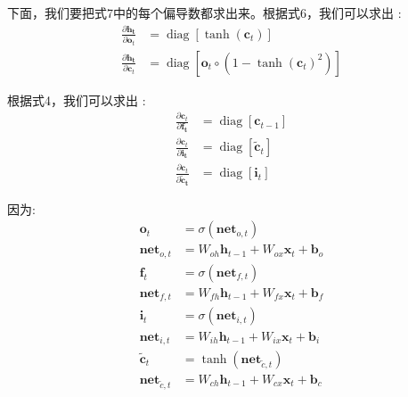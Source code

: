 \documentclass[10.5pt,compsoc]{CjC}
\theoremstyle{mystyle}
\begin{document}
下面，我们要把式7中的每个偏导数都求出来。根据式6，我们可以求出 :
$$
\begin{aligned}
\frac{\partial \mathbf{h}_{\mathbf{t}}}{\partial \mathbf{o}_{t}} &=\operatorname{diag}\left[\tanh \left(\mathbf{c}_{t}\right)\right] \\
\frac{\partial \mathbf{h}_{\mathbf{t}}}{\partial \mathbf{c}_{t}} &=\operatorname{diag}\left[\mathbf{o}_{t} \circ\left(1-\tanh \left(\mathbf{c}_{t}\right)^{2}\right)\right]
\end{aligned}
$$

根据式4，我们可以求出 :
$$
\begin{aligned}
\frac{\partial \mathbf{c}_{t}}{\partial \mathbf{f}_{\mathbf{t}}} &=\operatorname{diag}\left[\mathbf{c}_{t-1}\right] \\
\frac{\partial \mathbf{c}_{t}}{\partial \mathbf{i}_{\mathbf{t}}} &=\operatorname{diag}\left[\tilde{\mathbf{c}}_{t}\right] \\
\frac{\partial \mathbf{c}_{t}}{\partial \tilde{\mathbf{c}}_{\mathbf{t}}} &=\operatorname{diag}\left[\mathbf{i}_{t}\right]
\end{aligned}
$$

因为:
$$
\begin{aligned}
\mathbf{o}_{t} &=\sigma\left(\mathbf{n e t}_{o, t}\right) \\
\mathbf{n e t}_{o, t} &=W_{o h} \mathbf{h}_{t-1}+W_{o x} \mathbf{x}_{t}+\mathbf{b}_{o} \\
\mathbf{f}_{t} &=\sigma\left(\mathbf{n e t}_{f, t}\right) \\
\mathbf{n e t}_{f, t} &=W_{f h} \mathbf{h}_{t-1}+W_{f x} \mathbf{x}_{t}+\mathbf{b}_{f} \\
\mathbf{i}_{t} &=\sigma\left(\mathbf{n e t}_{i, t}\right) \\
\mathbf{n e t}_{i, t} &=W_{i h} \mathbf{h}_{t-1}+W_{i x} \mathbf{x}_{t}+\mathbf{b}_{i} \\
\tilde{\mathbf{c}}_{t} &=\tanh \left(\mathbf{n e t}_{\tilde{c}, t}\right) \\
\mathbf{n e t}_{\tilde{c}, t} &=W_{c h} \mathbf{h}_{t-1}+W_{c x} \mathbf{x}_{t}+\mathbf{b}_{c}
\end{aligned}
$$
\end{document}
